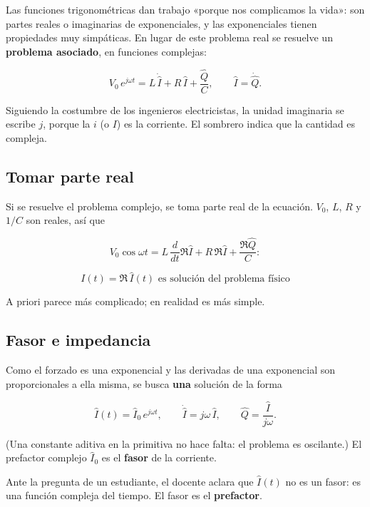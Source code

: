 \documentclass[12pt,a4paper]{article}
\begin{document}
Las funciones trigonométricas dan trabajo «porque nos complicamos la vida»: son
partes reales o imaginarias de exponenciales, y las exponenciales tienen
propiedades muy simpáticas. En lugar de este problema real se resuelve un
\textbf{problema asociado}, en funciones complejas:

\[
V_0\,e^{j\omega t} = L\,\dot{\hat I} + R\,\hat I + \frac{\hat Q}{C},
\qquad \hat I = \dot{\hat Q} .
\]

\begin{notebox}[Notación]
Siguiendo la costumbre de los ingenieros electricistas, la
unidad imaginaria se escribe $j$, porque la $i$ (o $I$) es la corriente. El
sombrero indica que la cantidad es compleja.
\end{notebox}

\subsection{Tomar parte real}

Si se resuelve el problema complejo, se toma parte real de la ecuación. $V_0$,
$L$, $R$ y $1/C$ son reales, así que

\[
V_0\cos\omega t = L\,\frac{d}{dt}\Re\hat I + R\,\Re\hat I + \frac{\Re\hat Q}{C}:
\]

\begin{keybox}
\[
\boxed{\ I(t) = \Re\,\hat I(t) \text{ es solución del problema físico}\ }
\]
\end{keybox}

A priori parece más complicado; en realidad es más simple.

\subsection{Fasor e impedancia}

Como el forzado es una exponencial y las derivadas de una exponencial son
proporcionales a ella misma, se busca \textbf{una} solución de la forma

\[
\hat I(t) = \hat I_0\,e^{j\omega t},
\qquad
\dot{\hat I} = j\omega\,\hat I,
\qquad
\hat Q = \frac{\hat I}{j\omega}.
\]

(Una constante aditiva en la primitiva no hace falta: el problema es
oscilante.) El prefactor complejo $\hat I_0$ es el \textbf{fasor} de la corriente.

\begin{notebox}
Ante la pregunta de un estudiante, el docente aclara que $\hat I(t)$ no es un
fasor: es una función compleja del tiempo. El fasor es el \textbf{prefactor}.
\end{notebox}
\end{document}
